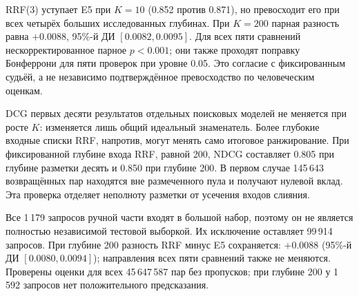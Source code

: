 RRF(3) уступает E5 при $K=10$ (0.852 против 0.871), но превосходит его при всех четырёх больших исследованных глубинах. При $K=200$ парная разность равна $+0.0088$, 95\%-й ДИ $[0.0082, 0.0095]$. Для всех пяти сравнений нескорректированное парное $p<0.001$; они также проходят поправку Бонферрони для пяти проверок при уровне 0.05. Это согласие с фиксированным судьёй, а не независимо подтверждённое превосходство по человеческим оценкам.

DCG первых десяти результатов отдельных поисковых моделей не меняется при росте $K$: изменяется лишь общий идеальный знаменатель. Более глубокие входные списки RRF, напротив, могут менять само итоговое ранжирование. При фиксированной глубине входа RRF, равной 200, NDCG составляет 0.805 при глубине разметки десять и 0.850 при глубине 200. В первом случае 145\,643 возвращённых пар находятся вне размеченного пула и получают нулевой вклад. Эта проверка отделяет неполноту разметки от усечения входов слияния.

Все 1\,179 запросов ручной части входят в большой набор, поэтому он не является полностью независимой тестовой выборкой. Их исключение оставляет 99\,914 запросов. При глубине 200 разность RRF минус E5 сохраняется: $+0.0088$ (95\%-й ДИ $[0.0080, 0.0094]$); направления всех пяти сравнений также не меняются. Проверены оценки для всех 45\,647\,587 пар без пропусков; при глубине 200 у 1\,592 запросов нет положительного предсказания.
